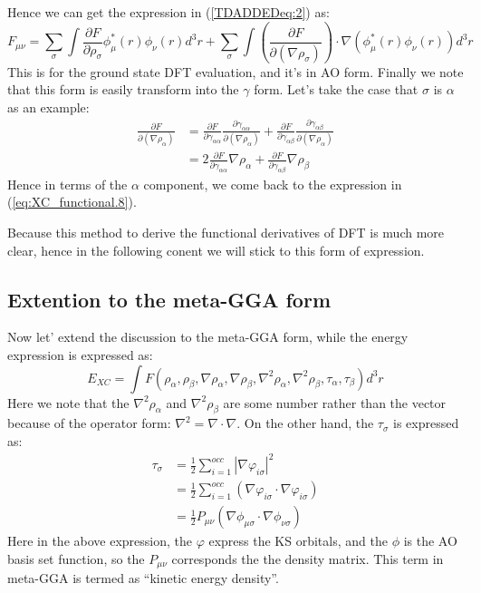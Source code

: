 Hence we can get the expression in (\ref{TDADDEDeq:2}) as:
\begin{equation}
 F_{\mu\nu} = \sum_{\sigma}\int \frac{\partial F} {\partial
\rho_{\sigma}} \phi^{*}_{\mu}(r)\phi_{\nu}(r) d^{3}r 
+ \sum_{\sigma}\int 
 \left(
    \frac{\partial F}{\partial (\nabla\rho_{\sigma})}
  \right)\cdot 
\nabla(\phi^{*}_{\mu}(r)\phi_{\nu}(r)) d^{3}r 
\end{equation} 
This is for the ground state DFT evaluation, and it's in AO form.
Finally we note that this form is easily transform into the
$\gamma$ form. Let's take the case that $\sigma$ is $\alpha$ as an
example: 
\begin{align}
\label{TDADDEDeq:1} 
\frac{\partial F}{\partial (\nabla\rho_{\alpha})} &=
\frac{\partial F}{\partial\gamma_{\alpha\alpha}}
\frac{\partial\gamma_{\alpha\alpha}}{\partial(\nabla\rho_{\alpha})} 
+ 
\frac{\partial F}{\partial\gamma_{\alpha\beta}}
\frac{\partial\gamma_{\alpha\beta}}{\partial(\nabla\rho_{\alpha})}
\nonumber \\
&= 2\frac{\partial F} {\partial \gamma_{\alpha\alpha}}
   \nabla\rho_{\alpha} + \frac{\partial F}
   {\partial \gamma_{\alpha\beta}} \nabla\rho_{\beta} 
\end{align}
Hence in terms of the $\alpha$ component, we come back to the
expression in (\ref{eq:XC_functional.8}).

Because this method to derive the functional derivatives of DFT is
much more clear, hence in the following conent we will stick to this
form of expression.

\subsection{Extention to the meta-GGA form}
%
%
%
%
%
Now let' extend the discussion to the meta-GGA form, while the energy
expression is expressed as:
\begin{equation}
 \label{functional_mega_gga_eq:1}
E_{XC} = \int  F(\rho_{\alpha}, \rho_{\beta}, \nabla\rho_{\alpha},
\nabla\rho_{\beta}, \nabla^{2}\rho_{\alpha},
\nabla^{2}\rho_{\beta}, \tau_{\alpha}, \tau_{\beta})d^{3}r
\end{equation} 
Here we note that the $ \nabla^{2}\rho_{\alpha}$ and
$\nabla^{2}\rho_{\beta}$ are some number rather than the vector
because of the operator form: $\nabla^{2} = \nabla\cdotp\nabla$. On
the other hand, the $\tau_{\sigma}$ is expressed as:
\begin{equation}
 \begin{split}
  \tau_{\sigma} 
&= \frac{1}{2}\sum_{i=1}^{occ}|\nabla\varphi_{i\sigma}|^{2} \\
&= \frac{1}{2}\sum_{i=1}^{occ}(\nabla\varphi_{i\sigma}\cdotp
\nabla\varphi_{i\sigma}) \\
&= \frac{1}{2}P_{\mu\nu}(\nabla\phi_{\mu\sigma}\cdotp
\nabla\phi_{\nu\sigma})
 \end{split}
\label{functional_mega_gga_eq:2}
\end{equation} 
Here in the above expression, the $\varphi$ express the KS orbitals,
and the $\phi$ is the AO basis set function, so the $P_{\mu\nu}$
corresponds the the density matrix. This term in meta-GGA is termed
as ``kinetic energy density''. 

